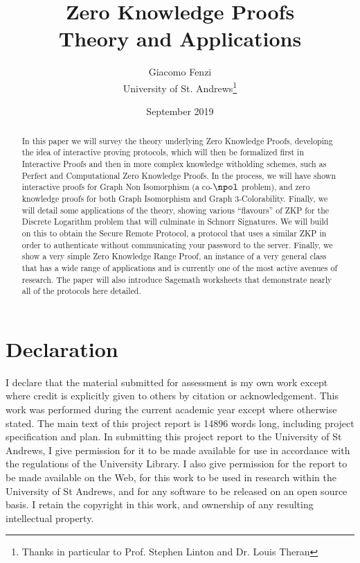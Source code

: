 \documentclass{article}
\title{Zero Knowledge Proofs \\ Theory and Applications}
\author{Giacomo Fenzi \\ University of St. Andrews\thanks{Thanks in particular to Prof. Stephen Linton and Dr. Louis Theran}}
\date{September 2019}
\begin{document}
\maketitle
\newpage

\begin{abstract}
    In this paper we will survey the theory underlying Zero Knowledge Proofs,
    developing the idea of interactive proving protocols, which will then be formalized first in Interactive Proofs
    and then in more complex knowledge witholding schemes, such as Perfect and Computational Zero Knowledge Proofs.
    In the process, we will have shown interactive proofs for Graph Non Isomorphism (a co-$\npol$ problem),
    and zero knowledge proofs for both Graph Isomorphism and Graph 3-Colorability.
    Finally, we will detail some applications of the theory, showing various \enquote{flavours} of ZKP for the Discrete Logarithm problem that will culminate in
    Schnorr Signatures. We will build on this to obtain the Secure Remote Protocol, a protocol that uses a similar ZKP in order
    to authenticate without communicating your password to the server. Finally, we show a very simple Zero Knowledge
    Range Proof, an instance of a very general class that has a wide range of applications and is currently one of the most active avenues of research.
    The paper will also introduce Sagemath worksheets that demonstrate nearly all of the protocols here detailed.
\end{abstract}

\section*{Declaration}
I declare that the material submitted for assessment is my own work except where credit is explicitly given to others
by citation or acknowledgement.
This work was performed during the current academic year except where otherwise stated.
The main text of this project report is 14896 words long, including project specification and plan.
In submitting this project report to the University of St Andrews, I give permission for it to be made available for use
in accordance with the regulations of the University Library. I also give permission for the report to be made
available on the Web, for this work to be used in research within the University of St Andrews,
and for any software to be released on an open source basis. I retain the copyright in this work, and ownership of any
resulting intellectual property.

\tableofcontents
\end{document}
